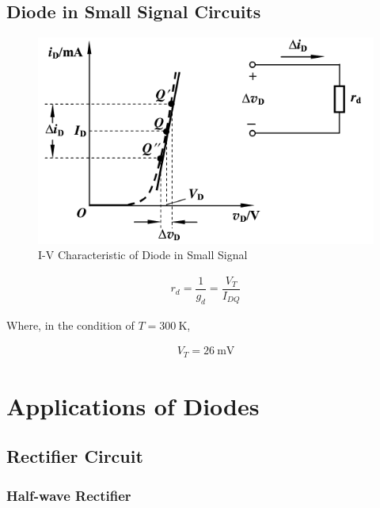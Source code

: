 \subsection{Diode in Small Signal Circuits}

\begin{figure}[H]
  \centering
  \includegraphics[width=0.7\linewidth]{figures/Diode-Small-Signal}
  \caption{I-V Characteristic of Diode in Small Signal}
\end{figure}

\begin{equation*}
  \begin{aligned}
    r_d = \dfrac{1}{g_d} = \dfrac{V_T}{I_{DQ}}  
  \end{aligned}
\end{equation*}

Where, in the condition of $T = 300 \  \mathrm{K}$,

\begin{equation*}
  \begin{aligned}
    V_T = 26 \  \mathrm{mV}
  \end{aligned}
\end{equation*}

\section{Applications of Diodes}

\subsection{Rectifier Circuit}

\subsubsection{Half-wave Rectifier}


